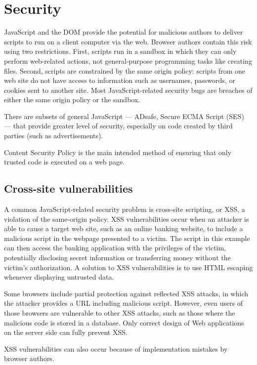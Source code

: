 \chapter{Security}




JavaScript and the DOM provide the potential for malicious authors to deliver scripts to run on a client computer via the web. Browser authors contain this risk using two restrictions. First, scripts run in a sandbox in which they can only perform web-related actions, not general-purpose programming tasks like creating files. Second, scripts are constrained by the same origin policy: scripts from one web site do not have access to information such as usernames, passwords, or cookies sent to another site. Most JavaScript-related security bugs are breaches of either the same origin policy or the sandbox.


There are subsets of general JavaScript — ADsafe, Secure ECMA Script (SES) — that provide greater level of security, especially on code created by third parties (such as advertisements).


Content Security Policy is the main intended method of ensuring that only trusted code is executed on a web page.


\section{Cross-site vulnerabilities}

A common JavaScript-related security problem is cross-site scripting, or XSS, a violation of the same-origin policy. XSS vulnerabilities occur when an attacker is able to cause a target web site, such as an online banking website, to include a malicious script in the webpage presented to a victim. The script in this example can then access the banking application with the privileges of the victim, potentially disclosing secret information or transferring money without the victim's authorization. A solution to XSS vulnerabilities is to use HTML escaping whenever displaying untrusted data.

Some browsers include partial protection against reflected XSS attacks, in which the attacker provides a URL including malicious script. However, even users of those browsers are vulnerable to other XSS attacks, such as those where the malicious code is stored in a database. Only correct design of Web applications on the server side can fully prevent XSS.


XSS vulnerabilities can also occur because of implementation mistakes by browser authors.

